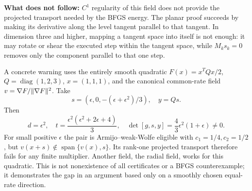\textbf{What does not follow:} $C^1$ regularity of this field does not provide the projected transport needed by the BFGS energy. The planar proof succeeds by making its derivative along the level tangent parallel to that tangent. In dimension three and higher, mapping a tangent space into itself is not enough: it may rotate or shear the executed step within the tangent space, while $M_ks_k=0$ removes only the component parallel to that one step.

A concrete warning uses the entirely smooth quadratic $F(x)=x^TQx/2$, $Q=\operatorname{diag}(1,2,3)$, $x=(1,1,1)$, and the canonical common-rate field $v=\nabla F/\lVert \nabla F\rVert^2$. Take
\[
 s=(\epsilon,0,-(\epsilon+\epsilon^2)/3),\quad y=Qs.
\]
Then
\[
 d=\epsilon^2,\quad t=\frac{\epsilon^2(\epsilon^2+2\epsilon+4)}3,\quad
 \det[g,s,y]=\frac43\epsilon^2(1+\epsilon)\ne0.
\]
For small positive $\epsilon$ the pair is Armijo--weak-Wolfe eligible with $c_1=1/4,c_2=1/2$, but $v(x+s)\notin\operatorname{span}\{v(x),s\}$. Its rank-one projected transport therefore fails for any finite multiplier. Another field, the radial field, works for this quadratic. This is not nonexistence of all certificates or a BFGS counterexample; it demonstrates the gap in an argument based only on a smoothly chosen equal-rate direction.


\endgroup
